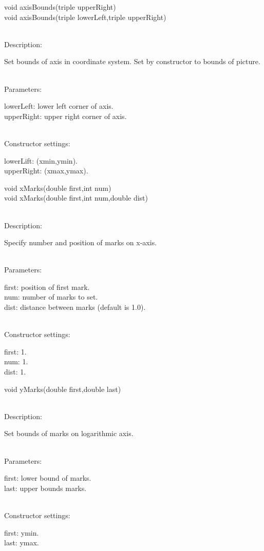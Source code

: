 \documentclass[12pt,a4paper]{article}
\newcommand{\memberitem}[1]{
                              \vspace{-0.5pc}
                              \end{minipage}\\
                              \phantom{M}#1:\\
                              \phantom{MM}
                              \begin{minipage}[t]{12cm}

                           }
\newcommand{\memdsc}{\memberitem{Description}}
\newcommand{\meminp}{\memberitem{Parameters}}
\newcommand{\memdef}{\memberitem{Constructor settings}}
\newenvironment{MemberDescr}
  {
    \begin{minipage}{15cm}
    \bf
  }
  {
    \end{minipage}
  }
\begin{document}
  \begin{MemberDescr}
    void axisBounds(triple upperRight)\\
    void axisBounds(triple lowerLeft,triple upperRight)\\
    \memdsc
      Set bounds of axis in coordinate system. Set by constructor to bounds
      of picture.\\
    \meminp
      lowerLeft:  lower left corner of axis.\\
      upperRight: upper right corner of axis.\\
    \memdef
      lowerLift: (xmin,ymin).\\
      upperRight: (xmax,ymax).\\
  \end{MemberDescr}

  \begin{MemberDescr}
    void xMarks(double first,int num)\\
    void xMarks(double first,int num,double dist)\\
    \memdsc
      Specify number and position of marks on x-axis.\\
    \meminp
      first: position of first mark.\\
      num:   number of marks to set.\\
      dist:  distance between marks (default is 1.0).\\
    \memdef
      first: 1.\\
      num:   1.\\
      dist:  1.\\
  \end{MemberDescr}

  \begin{MemberDescr}
    void yMarks(double first,double last)\\
    \memdsc
      Set bounds of marks on logarithmic axis.\\
    \meminp
      first: lower bound of marks.\\
      last: upper bounds marks.\\
    \memdef
      first: ymin.\\
      last: ymax.\\
  \end{MemberDescr}
\end{document}
